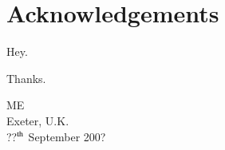

\chapter*{Acknowledgements}

Hey.

\vspace{0.2in} \noindent
Thanks.

\begin{flushright}
{ ME \\ Exeter, U.K. \\ ??$^{\rm th}$ September 200?}
\end{flushright}
